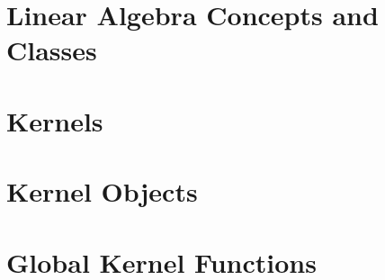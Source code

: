 


\lcTex{}

\clearpage
\section{Linear Algebra Concepts and Classes}
\gdef\ccRefPageBreak{\ccFalse}

\gdef\ccRefPageBreak{\ccTrue}





\clearpage
\section{Kernels}
\gdef\ccRefPageBreak{\ccFalse}


\gdef\ccRefPageBreak{\ccTrue}


\clearpage
\section{Kernel Objects}
\gdef\ccRefPageBreak{\ccFalse}


\gdef\ccRefPageBreak{\ccTrue}












\clearpage
\section{Global Kernel Functions}
\gdef\ccRefPageBreak{\ccFalse}


\gdef\ccRefPageBreak{\ccTrue}





















